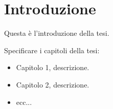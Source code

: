 {}
\chapter*{Introduzione}

Questa è l'introduzione della tesi.

Specificare i capitoli della tesi:
\begin{itemize}
	\item Capitolo 1, descrizione.
	\item Capitolo 2, descrizione.
	\item ecc...
\end{itemize}

